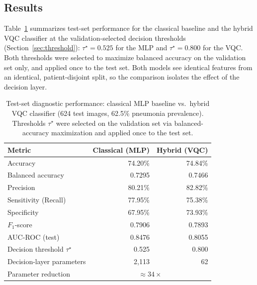\documentclass[11pt,a4paper]{article}
\begin{document}
\subsection{Results}

Table~\ref{tab:results} summarizes test-set performance for the classical
baseline and the hybrid VQC classifier at the validation-selected decision
thresholds (Section~\ref{sec:threshold}): $\tau^\star = 0.525$ for the MLP and
$\tau^\star = 0.800$ for the VQC.  Both thresholds were selected to maximize
balanced accuracy on the validation set only, and applied once to the test
set.  Both models see identical features from an identical, patient-disjoint
split, so the comparison isolates the effect of the decision layer.

\begin{table}[htbp]
\centering
\caption{Test-set diagnostic performance: classical MLP baseline vs.\ hybrid
  VQC classifier (624 test images, 62.5\% pneumonia prevalence).  Thresholds
  $\tau^\star$ were selected on the validation set via balanced-accuracy
  maximization and applied once to the test set.}
\label{tab:results}
\begin{tabular}{@{}lrr@{}}
\toprule
Metric & Classical (MLP) & Hybrid (VQC) \\
\midrule
Accuracy              & 74.20\% & 74.84\% \\
Balanced accuracy     & 0.7295  & 0.7466  \\
Precision             & 80.21\% & 82.82\% \\
Sensitivity (Recall)  & 77.95\% & 75.38\% \\
Specificity           & 67.95\% & 73.93\% \\
$F_1$-score           & 0.7906  & 0.7893  \\
AUC-ROC (test)        & 0.8476  & 0.8055  \\
\addlinespace
Decision threshold $\tau^\star$ & 0.525 & 0.800 \\
Decision-layer parameters & 2{,}113 & 62 \\
Parameter reduction       & \multicolumn{2}{c}{$\approx 34\times$} \\
\bottomrule
\end{tabular}
\end{table}
\end{document}
